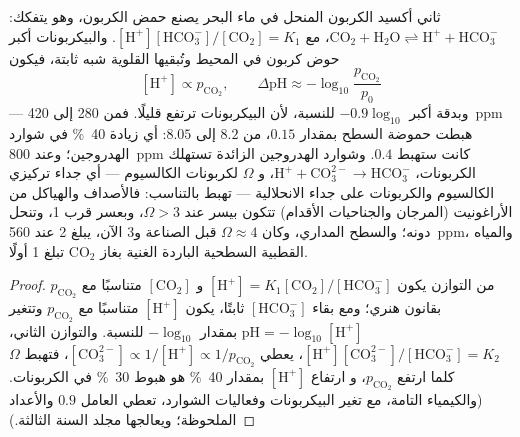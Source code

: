 \begin{theorem}[التحمض]\label{thm:b2:global-change:acid}
ثاني أكسيد الكربون المنحل في ماء البحر يصنع حمض الكربون، وهو
يتفكك: $\ensuremath{\mathrm{CO_2}} + \ensuremath{\mathrm{H_2O}} \rightleftharpoons \ensuremath{\mathrm{H^{+}}} +
\ensuremath{\mathrm{HCO_3^{-}}}$، مع $[\ensuremath{\mathrm{H^{+}}}][\ensuremath{\mathrm{HCO_3^{-}}}]/[\ensuremath{\mathrm{CO_2}}] = K_1$.
والبيكربونات أكبر حوض كربون في المحيط وتُبقيها القلوية
شبه ثابتة، فيكون
\[
[\ensuremath{\mathrm{H^{+}}}] \propto p_{\ensuremath{\mathrm{CO_2}}}, \qquad
\Delta\mathrm{pH} \approx -\log_{10}\frac{p_{\ensuremath{\mathrm{CO_2}}}}{p_0}
\]
--- وبدقة أكبر $-0.9\log_{10}$ للنسبة، لأن البيكربونات
ترتفع قليلًا. فمن 280 إلى \qty{420}{ppm} هبطت حموضة السطح
بمقدار $0.15$، من $8.2$ إلى $8.05$: أي زيادة \qty{40}{\%} في شوارد
الهدروجين؛ وعند \qty{800}{ppm} كانت ستهبط $0.4$. وشوارد الهدروجين
الزائدة تستهلك الكربونات، $\ensuremath{\mathrm{H^{+}}} + \ensuremath{\mathrm{CO_3^{2-}}} \to \ensuremath{\mathrm{HCO_3^{-}}}$، و
\emph{} $\Omega$ لكربونات الكالسيوم ---
أي جداء تركيزي الكالسيوم والكربونات على
جداء الانحلالية --- تهبط بالتناسب: فالأصداف والهياكل
من الأراغونيت (المرجان والجناحيات الأقدام) تتكون بيسر عند $\Omega > 3$، وبعسر
قرب 1، وتنحل دونه؛ والسطح المداري،
وكان $\Omega \approx 4$ قبل الصناعة و3 الآن، يبلغ 2 عند
\qty{560}{ppm}، والمياه القطبية السطحية الباردة الغنية بغاز \ensuremath{\mathrm{CO_2}}
تبلغ 1 أولًا.
\end{theorem}
\begin{proof}
من التوازن يكون $[\ensuremath{\mathrm{H^{+}}}] = K_1[\ensuremath{\mathrm{CO_2}}]/[\ensuremath{\mathrm{HCO_3^{-}}}]$ و
$[\ensuremath{\mathrm{CO_2}}]$ متناسبًا مع $p_{\ensuremath{\mathrm{CO_2}}}$ بقانون هنري؛
ومع بقاء $[\ensuremath{\mathrm{HCO_3^{-}}}]$ ثابتًا، يكون $[\ensuremath{\mathrm{H^{+}}}]$ متناسبًا مع
$p_{\ensuremath{\mathrm{CO_2}}}$ وتتغير $\mathrm{pH} = -\log_{10}[\ensuremath{\mathrm{H^{+}}}]$ بمقدار
$-\log_{10}$ للنسبة. والتوازن الثاني، $[\ensuremath{\mathrm{H^{+}}}][\ensuremath{\mathrm{CO_3^{2-}}}]/[\ensuremath{\mathrm{HCO_3^{-}}}]
= K_2$، يعطي $[\ensuremath{\mathrm{CO_3^{2-}}}] \propto 1/[\ensuremath{\mathrm{H^{+}}}] \propto
1/p_{\ensuremath{\mathrm{CO_2}}}$، فتهبط $\Omega$ كلما ارتفع $p_{\ensuremath{\mathrm{CO_2}}}$، و
ارتفاع $[\ensuremath{\mathrm{H^{+}}}]$ بمقدار \qty{40}{\%} هو هبوط \qty{30}{\%} في
الكربونات. (والكيمياء التامة، مع تغير البيكربونات
وفعاليات الشوارد، تعطي العامل $0.9$ والأعداد
الملحوظة؛ ويعالجها مجلد السنة الثالثة.)
\end{proof}
